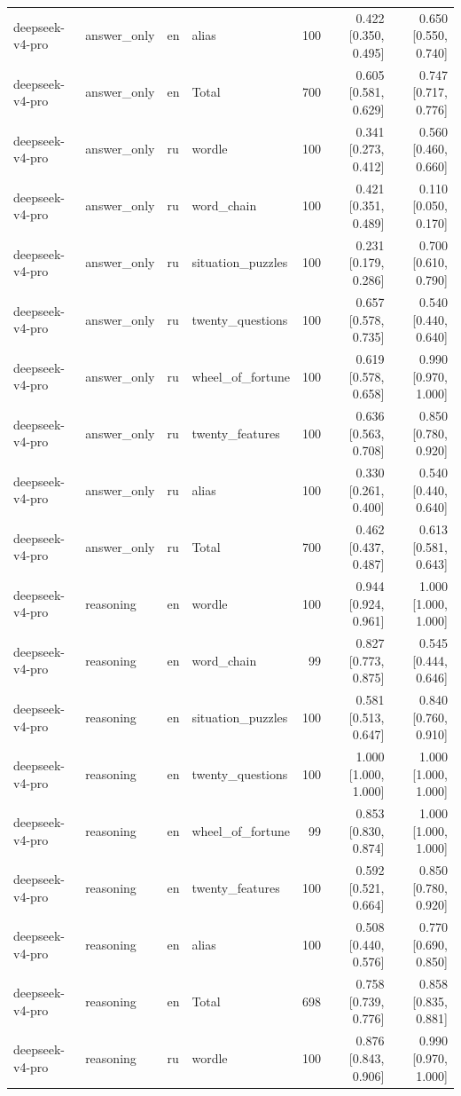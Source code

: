 \begin{longtable}{llllrrr}
deepseek-v4-pro & answer\_only & en & alias & 100 & 0.422 [0.350, 0.495] & 0.650 [0.550, 0.740] \\
deepseek-v4-pro & answer\_only & en & Total & 700 & 0.605 [0.581, 0.629] & 0.747 [0.717, 0.776] \\
deepseek-v4-pro & answer\_only & ru & wordle & 100 & 0.341 [0.273, 0.412] & 0.560 [0.460, 0.660] \\
deepseek-v4-pro & answer\_only & ru & word\_chain & 100 & 0.421 [0.351, 0.489] & 0.110 [0.050, 0.170] \\
deepseek-v4-pro & answer\_only & ru & situation\_puzzles & 100 & 0.231 [0.179, 0.286] & 0.700 [0.610, 0.790] \\
deepseek-v4-pro & answer\_only & ru & twenty\_questions & 100 & 0.657 [0.578, 0.735] & 0.540 [0.440, 0.640] \\
deepseek-v4-pro & answer\_only & ru & wheel\_of\_fortune & 100 & 0.619 [0.578, 0.658] & 0.990 [0.970, 1.000] \\
deepseek-v4-pro & answer\_only & ru & twenty\_features & 100 & 0.636 [0.563, 0.708] & 0.850 [0.780, 0.920] \\
deepseek-v4-pro & answer\_only & ru & alias & 100 & 0.330 [0.261, 0.400] & 0.540 [0.440, 0.640] \\
deepseek-v4-pro & answer\_only & ru & Total & 700 & 0.462 [0.437, 0.487] & 0.613 [0.581, 0.643] \\
deepseek-v4-pro & reasoning & en & wordle & 100 & 0.944 [0.924, 0.961] & 1.000 [1.000, 1.000] \\
deepseek-v4-pro & reasoning & en & word\_chain & 99 & 0.827 [0.773, 0.875] & 0.545 [0.444, 0.646] \\
deepseek-v4-pro & reasoning & en & situation\_puzzles & 100 & 0.581 [0.513, 0.647] & 0.840 [0.760, 0.910] \\
deepseek-v4-pro & reasoning & en & twenty\_questions & 100 & 1.000 [1.000, 1.000] & 1.000 [1.000, 1.000] \\
deepseek-v4-pro & reasoning & en & wheel\_of\_fortune & 99 & 0.853 [0.830, 0.874] & 1.000 [1.000, 1.000] \\
deepseek-v4-pro & reasoning & en & twenty\_features & 100 & 0.592 [0.521, 0.664] & 0.850 [0.780, 0.920] \\
deepseek-v4-pro & reasoning & en & alias & 100 & 0.508 [0.440, 0.576] & 0.770 [0.690, 0.850] \\
deepseek-v4-pro & reasoning & en & Total & 698 & 0.758 [0.739, 0.776] & 0.858 [0.835, 0.881] \\
deepseek-v4-pro & reasoning & ru & wordle & 100 & 0.876 [0.843, 0.906] & 0.990 [0.970, 1.000] \\

\end{longtable}
